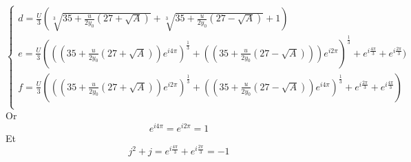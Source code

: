 \documentclass[12pt]{article}
\begin{document}
\begin{equation}
\left\{ \begin{array}{rl}
d = \frac{U}{3} ( \sqrt[3]{35+\frac{u}{2y_0}(27 + \sqrt{A})}+\sqrt[3]{35+\frac{u}{2y_0}(27 - \sqrt{A})} + 1)\\
e = \frac{U}{3} (((35+\frac{u}{2y_0}(27 + \sqrt{A})) e^{i4\pi})^{\frac{1}{3}} + ((35+\frac{u}{2y_0}(27 - \sqrt{A})))e^{i 2\pi})^{\frac{1}{3}}
+ e^{i\frac{4\pi}{3}} + e^{i\frac{2\pi}{3}} )\\
f = \frac{U}{3} (((35+\frac{u}{2y_0}(27 + \sqrt{A})) e^{i2\pi})^{\frac{1}{3}} + ((35+\frac{u}{2y_0}(27 - \sqrt{A}))e^{i 4\pi})^{\frac{1}{3}} 
+ e^{i\frac{2\pi}{3}} + e^{i\frac{4\pi}{3}} )\\
\end{array} \right.
\end{equation}
Or
\begin{equation}
 e^{i4\pi} = e^{i2\pi} = 1
\end{equation}
Et
\begin{equation}
 j^2+j= e^{i\frac{4\pi}{3}} + e^{i\frac{2\pi}{3}} = -1
\end{equation}
\end{document}
